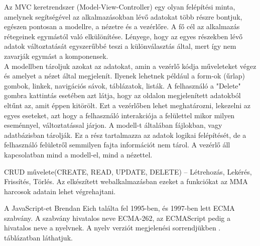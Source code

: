 

Az MVC keretrendszer (Model-View-Controller) egy olyan felépítési minta, amelynek segítségével az alkalmazásokban lévő adatokat több részre bontjuk, egészen pontosan a modellre, a nézetre és a vezérlőre. A fő cél az alkalmazás rétegeinek egymástól való elkülönítése. Lényege, hogy az egyes részekben lévő adatok változtatását egyszerűbbé teszi a különválasztás által, mert így nem zavarják egymást a komponensek. \\A modellben tároljuk azokat az adatokat, amin a vezérlő kódja műveleteket végez és amelyet a nézet által megjelenít. Ilyenek lehetnek például a form-ok (űrlap) gombok, linkek, navigációs sávok, táblázatok, listák. A felhasználó a "Delete" gombra kattintás esetében azt látja, hogy az oldalon megjelenített adatokból eltűnt az, amit éppen kitörölt. Ezt a vezérlőben lehet meghatározni, lekezelni az egyes eseteket, azt hogy a felhasználó interakciója a felülettel mikor milyen eseménnyel, változtatással járjon. A modell-t általában fájlokban, vagy adatbázisban tárolják. Ez a rész tartalmazza az adatok logikai felépítését, de a felhasználó felületről semmilyen fajta információt nem tárol. A vezérlő áll kapcsolatban mind a modell-el, mind a nézettel.

CRUD művelete(CREATE, READ, UPDATE, DELETE) – Létrehozás, Lekérés, Frissítés, Törlés.
Az elkészített webalkalmazásban ezeket a funkciókat az MMA harcosok adatain lehet végrehajtani.



A JavaScript-et Brendan Eich találta fel 1995-ben, és 1997-ben lett ECMA szabvány. A szabvány hivatalos neve ECMA-262, az ECMAScript pedig a hivatalos neve a nyelvnek. A nyelv verziót megjelenési sorrendjükben . táblázatban láthatjuk.

